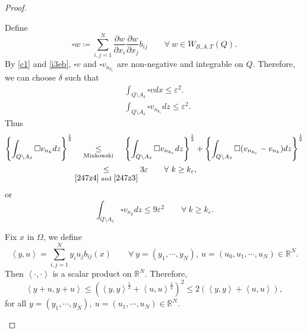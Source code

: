 \documentclass[11pt, a4paper]{article}
\numberwithin{equation}{section}
\newcommand{\coex}[2][\hphantom{longexplanation}]{%
  \underset{{#1}}{\overset{\hphantom{longexplanation}}{#2}}
}
\newcommand{\vuong}{\square}
\newcommand{\RR}{{\mathbb R}}
\begin{document}
\begin{proof}
\begin{description}[wide]
Define
\begin{equation}
  \vuong w \coloneqq  \sum_{i,j=1}^{N}\frac{\partial w}{\partial x_{i}}\frac{\partial w}{\partial x_{j}}b_{ij}\qquad\forall~w\in W_{B,A,T}(Q).
 \label{vuong}
 \end{equation}
 By \eqref{c1} and \eqref{i3eb}, $\vuong v$ and $\vuong v_{n_{k_{\varepsilon}}}$ are non-negative and integrable on $Q$. Therefore, we can choose  $\delta$ such that
 \begin{align}
   &\int_{Q\setminus A_{\delta}}\vuong v dx \le \varepsilon^{2}.
  \label{247z4b}\\
&\int_{Q\setminus A_{\delta}}\vuong v_{n_{k_{\varepsilon}}}dz\le \varepsilon^{2}.
  \label{247z4}
\end{align}
Thus
\begin{align*}
\left\{\int_{Q\setminus A_{\delta}} \vuong
  v_{n_{k}}dz\right\}^{\frac{1}{2}}
  &\coex[\text{Minkowski}]{\le}
  \left\{\int_{Q\setminus A_{\delta}}\vuong
    v_{n_{k_{\varepsilon}}}dz\right\}^{\frac{1}{2}}+\left\{\int_{Q\setminus
    A_{\delta}}\vuong (v_{n_{k_{\varepsilon}}}-
    v_{n_{k}})dz\right\}^{\frac{1}{2}}\\
  &\coex[\eqref{247z4} \text{ and }\eqref{247z3}]{\le}
    3\varepsilon\qquad\forall~ k\ge k_{\varepsilon},
\end{align*}
 or
 \begin{equation}
 \int_{Q\setminus A_{\delta}} \vuong v_{n_{k}}dz\le 9\varepsilon^{2} \qquad\forall~ k\ge k_{\varepsilon}. 
  \label{247z3b}
\end{equation}

Fix $x$ in $\Omega$, we define
\[
  \left\langle y,u \right\rangle= \sum_{i,j=1}^{N}y_{i}u_{j}b_{ij}(x)\qquad\forall~y=\left(y_{1},\cdots,y_{N} \right),~
  u=\left(u_{0},u_{1},\cdots,u_{N} \right)\in \RR^{N}.
\]
Then $\left\langle \cdot,\cdot \right\rangle$ is a
scalar product on $\RR^{N}$. Therefore,
\[
  \left\langle y+u,y+u \right\rangle
  \le \left(\left\langle y,y \right\rangle^{\frac{1}{2}} + \left\langle u,u \right\rangle^{\frac{1}{2}}  \right)^{2}\le 2(\left\langle y,y \right\rangle+\left\langle u,u \right\rangle),
\]
for all $y=(y_{1},\cdots,y_{N}),~ u=(u_{1},\cdots,u_{N})\in \RR^{N}.$


\end{description}
\end{proof}
\end{document}
